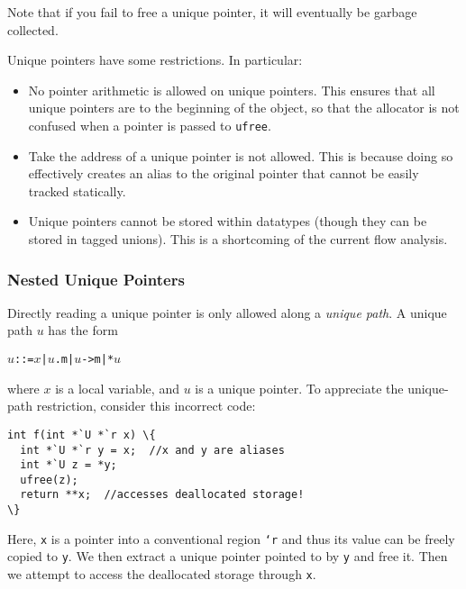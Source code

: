 Note that if you fail to free a unique pointer, it will eventually be
garbage collected.

Unique pointers have some restrictions.  In particular:
\begin{itemize}
\item No pointer arithmetic is allowed on unique pointers.  This ensures
  that all unique pointers are to the beginning of the object, so that the
  allocator is not confused when a pointer is passed to \texttt{ufree}.
\item Take the address of a unique pointer is not allowed.  This is because
  doing so effectively creates an alias to the original pointer that cannot
  be easily tracked statically.
\item Unique pointers cannot be stored within datatypes (though they can be
  stored in tagged unions).  This is a shortcoming of the current flow
  analysis.
\end{itemize}

\subsubsection{Nested Unique Pointers}

Directly reading a unique pointer is only allowed along a \emph{unique
path}.  A unique path $u$ has the form
\begin{alltt}
\qquad  $u$ ::= $x$ | $u$.m | $u$->m | *$u$
\end{alltt}
where $x$ is a local variable, and $u$ is a unique pointer.  To
appreciate the unique-path restriction, consider this incorrect code:
\begin{verbatim}
int f(int *`U *`r x) \{
  int *`U *`r y = x;  //x and y are aliases
  int *`U z = *y;
  ufree(z);
  return **x;  //accesses deallocated storage!
\}
\end{verbatim}
Here, \texttt{x} is a pointer into a conventional region \texttt{`r} and
thus its value can be freely copied to \texttt{y}.  We then extract a unique
pointer pointed to by \texttt{y} and free it.  Then we attempt to access the
deallocated storage through \texttt{x}.

